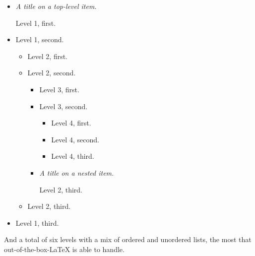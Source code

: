 \documentclass[pdflatex]{sn-jnl}
\theoremstyle{thmstyleone}%
\theoremstyle{thmstyletwo}%
\theoremstyle{thmstylethree}%
\newcommand{\lititle}[1]{{\slshape#1}}
\numberwithin{equation}{section}
\begin{document}
\begin{itemize}[label=\textbullet]
\item{}\lititle{A title on a top-level item.}\par%
Level 1, first.%
\item{}Level 1, second.%
\begin{itemize}[label=$\circ$]
\item{}Level 2, first.%
\item{}Level 2, second.%
\begin{itemize}[label=$\blacksquare$]
\item{}Level 3, first.%
\item{}Level 3, second.%
\begin{itemize}[label=\textbullet]
\item{}Level 4, first.%
\item{}Level 4, second.%
\item{}Level 4, third.%
\end{itemize}
%
\item{}\lititle{A title on a nested item.}\par%
Level 2, third.%
\end{itemize}
%
\item{}Level 2, third.%
\end{itemize}
%
\item{}Level 1, third.%
\end{itemize}
%
\par
And a total of six levels with a mix of ordered and unordered lists, the most that out-of-the-box-\LaTeX{} is able to handle.%
\end{document}
